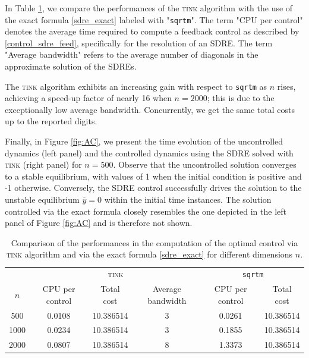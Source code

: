 \documentclass[a4paper,10pt]{article}
\begin{document}
In Table \ref{table_AC}, we compare the performances of the \textsc{tink} algorithm with the use of the exact formula \eqref{sdre_exact} labeled with "\texttt{sqrtm}". The term "CPU per control" denotes the average time required to compute a feedback control as described by \eqref{control_sdre_feed}, specifically for the resolution of an SDRE. The term "Average bandwidth" refers to the average number of diagonals in the approximate solution of the SDREs.


The \textsc{tink} algorithm exhibits an increasing gain with respect to \texttt{sqrtm} as $n$ rises, achieving a speed-up factor of nearly 16 when $n=2000$; this is due to the exceptionally low average bandwidth. Concurrently,  we get the same total costs up to the reported digits. %

Finally, in Figure \ref{fig:AC}, we present the time evolution of the uncontrolled dynamics (left panel) and the controlled dynamics using the SDRE solved with \textsc{tink} (right panel) for $n=500$. Observe that the uncontrolled solution converges to a stable equilibrium, with values of 1
 when the initial condition is positive and -1 otherwise. Conversely, the SDRE control successfully drives the solution to the unstable equilibrium $\overline{y}=0$ within the initial time instances. The solution controlled via the exact formula closely resembles the one depicted in the left panel of Figure \ref{fig:AC} and is therefore not shown.




\begin{table}[hbht]
\centering
\begin{tabular}{c|ccc|cc}    

        & \multicolumn{3}{c|}{\textsc{tink}}   & \multicolumn{2}{c}{\texttt{sqrtm}} \\
$n$   & CPU per control & Total cost & Average bandwidth  & CPU per control & Total cost
\\\hline
500    & 0.0108 &   10.386514 & 3  &  0.0261  &   10.386514\\
1000 &  0.0234 &  10.386514 & 3 &  0.1855 & 10.386514\\
2000 &   0.0807 &   10.386514 & 8 &   1.3373 &  10.386514\\
 \end{tabular}
  \caption{Comparison of the performances in the computation of the optimal control via \textsc{tink} algorithm and via the exact formula \eqref{sdre_exact} for different dimensions $n$.}
 \label{table_AC}
\end{table}
\end{document}
